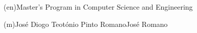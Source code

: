 \ntdegreename*(en){Master's Program in Computer Science and Engineering}










\ntauthorname(m){José Diogo Teotónio Pinto Romano}{José Romano}



